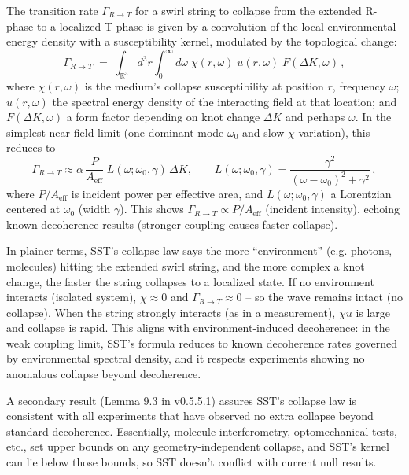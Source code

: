 \documentclass[reprint,aps,onecolumn,nofootinbib]{revtex4-2}
\begin{document}
	\begin{tcolorbox}[title=Theorem 8.1: R$\to$T Transition Dynamics (Collapse Rate)]
		The transition rate $\Gamma_{R\to T}$ for a swirl string to collapse from the extended R-phase to a localized T-phase is given by a convolution of the local environmental energy density with a susceptibility kernel, modulated by the topological change:
		\[
			\Gamma_{R\to T} \;=\; \int_{\mathbb{R}^3}\! d^3r \int_0^{\infty}\! d\omega\;\chi(r,\omega)\;u(r,\omega)\;F(\Delta K,\omega)\,,
		\]
		where $\chi(r,\omega)$ is the medium’s collapse susceptibility at position $r$, frequency $\omega$; $u(r,\omega)$ the spectral energy density of the interacting field at that location; and $F(\Delta K,\omega)$ a form factor depending on knot change $\Delta K$ and perhaps $\omega$. In the simplest near-field limit (one dominant mode $\omega_0$ and slow $\chi$ variation), this reduces to
		\[
			\Gamma_{R\to T} \approx \alpha\, \frac{P}{A_{\text{eff}}}\; L(\omega; \omega_0,\gamma)\,\Delta K, \qquad
			L(\omega; \omega_0,\gamma) = \frac{\gamma^2}{(\omega-\omega_0)^2+\gamma^2}\,,
		\]
		where $P/A_{\text{eff}}$ is incident power per effective area, and $L(\omega; \omega_0,\gamma)$ a Lorentzian centered at $\omega_0$ (width $\gamma$). This shows $\Gamma_{R\to T} \propto P/A_{\text{eff}}$ (incident intensity), echoing known decoherence results (stronger coupling causes faster collapse).
	\end{tcolorbox}

	\noindent In plainer terms, SST’s collapse law says the more “environment” (e.g. photons, molecules) hitting the extended swirl string, and the more complex a knot change, the faster the string collapses to a localized state. If no environment interacts (isolated system), $\chi \approx 0$ and $\Gamma_{R\to T}\approx 0$ – so the wave remains intact (no collapse). When the string strongly interacts (as in a measurement), $\chi u$ is large and collapse is rapid. This aligns with environment-induced decoherence: in the weak coupling limit, SST’s formula reduces to known decoherence rates governed by environmental spectral density, and it respects experiments showing no anomalous collapse beyond decoherence.

	A secondary result (Lemma 9.3 in v0.5.5.1) assures SST’s collapse law is consistent with all experiments that have observed no extra collapse beyond standard decoherence. Essentially, molecule interferometry, optomechanical tests, etc., set upper bounds on any geometry-independent collapse, and SST’s kernel can lie below those bounds, so SST doesn’t conflict with current null results.
\end{document}
